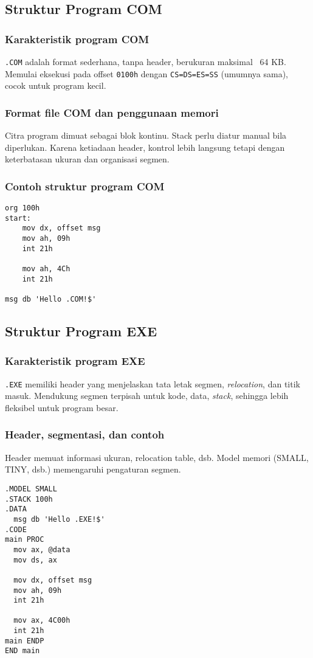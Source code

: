 \subsection{Struktur Program COM}
\subsubsection{Karakteristik program COM}
\texttt{.COM} adalah format sederhana, tanpa header, berukuran maksimal ~64 KB. Memulai eksekusi pada offset \texttt{0100h} dengan \texttt{CS=DS=ES=SS} (umumnya sama), cocok untuk program kecil.

\subsubsection{Format file COM dan penggunaan memori}
Citra program dimuat sebagai blok kontinu. Stack perlu diatur manual bila diperlukan. Karena ketiadaan header, kontrol lebih langsung tetapi dengan keterbatasan ukuran dan organisasi segmen.

\subsubsection{Contoh struktur program COM}
\begin{verbatim}
org 100h
start:
    mov dx, offset msg
    mov ah, 09h
    int 21h

    mov ah, 4Ch
    int 21h

msg db 'Hello .COM!$'
\end{verbatim}

\subsection{Struktur Program EXE}
\subsubsection{Karakteristik program EXE}
\texttt{.EXE} memiliki header yang menjelaskan tata letak segmen, \textit{relocation}, dan titik masuk. Mendukung segmen terpisah untuk kode, data, \textit{stack}, sehingga lebih fleksibel untuk program besar.

\subsubsection{Header, segmentasi, dan contoh}
Header memuat informasi ukuran, relocation table, dsb. Model memori (SMALL, TINY, dsb.) memengaruhi pengaturan segmen.
\begin{verbatim}
.MODEL SMALL
.STACK 100h
.DATA
  msg db 'Hello .EXE!$'
.CODE
main PROC
  mov ax, @data
  mov ds, ax

  mov dx, offset msg
  mov ah, 09h
  int 21h

  mov ax, 4C00h
  int 21h
main ENDP
END main
\end{verbatim}

